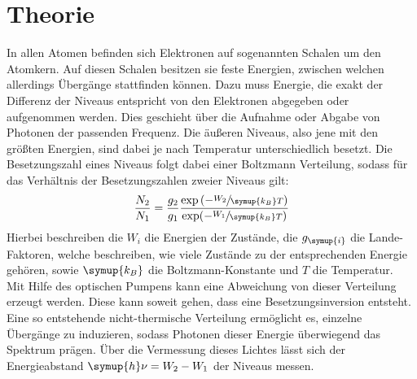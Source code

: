 \section{Theorie}
\label{sec:theorie}

In allen Atomen befinden sich Elektronen auf sogenannten Schalen um den
Atomkern. Auf diesen Schalen besitzen sie feste Energien, zwischen welchen
allerdings Übergänge stattfinden können. Dazu muss Energie, die exakt der
Differenz der Niveaus entspricht von den Elektronen abgegeben oder aufgenommen
werden. Dies geschieht über die Aufnahme oder Abgabe von Photonen der
passenden Frequenz. Die äußeren Niveaus, also jene mit den größten Energien,
sind dabei je nach Temperatur unterschiedlich besetzt. Die Besetzungszahl eines
Niveaus folgt dabei einer Boltzmann Verteilung, sodass für das Verhältnis der
Besetzungszahlen zweier Niveaus gilt:
%
\begin{equation}
  \frac{N_2}{N_1}=\frac{g_2}{g_1}\frac{\exp\left(-\sfrac{W_2}{\symup{k_B}T}\right)}{\exp(-\sfrac{W_1}{\symup{k_B}T})}
\end{equation}
%
Hierbei beschreiben die $W_i$ die Energien der Zustände, die $g_{\symup{i}}$ die
Lande-Faktoren, welche beschreiben, wie viele Zustände zu der entsprechenden
Energie gehören, sowie $\symup{k_B}$ die Boltzmann-Konstante und $T$ die
Temperatur. \\
Mit Hilfe des optischen Pumpens kann eine Abweichung von dieser Verteilung
erzeugt werden. Diese kann soweit gehen, dass eine Besetzungsinversion
entsteht. Eine so entstehende nicht-thermische Verteilung ermöglicht es,
einzelne Übergänge zu induzieren, sodass Photonen dieser Energie überwiegend
das Spektrum prägen. Über die Vermessung dieses Lichtes lässt sich der
Energieabstand $\symup{h}\nu=W_2-W_1$ der Niveaus messen.

